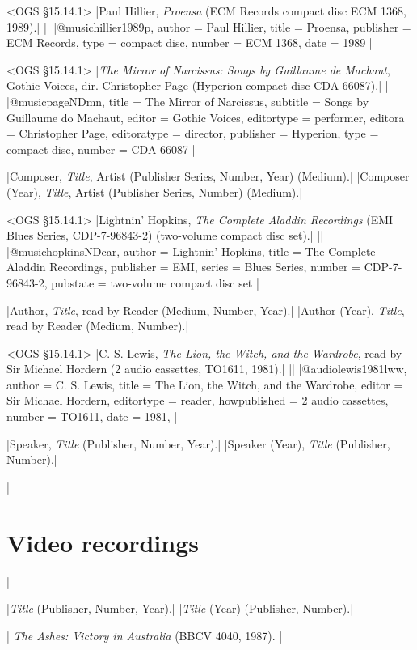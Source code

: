\documentclass[extrafontsizes,11pt,a4paper,oneside]{memoir}
\newcommand*{\lit}[1]{\textsf{#1}}
\begin{document}
\bibexample<OGS \S15.14.1>
|Paul Hillier, \emph{Proensa} (ECM Records compact disc ECM 1368, 1989).|%
||%
|@music{hillier1989p,
  author = {Paul Hillier},
  title = {Proensa},
  publisher = {ECM Records},
  type = {compact disc},
  number = {ECM 1368},
  date = {1989}
}|

\bibexample<OGS \S15.14.1>
|\emph{The Mirror of Narcissus: Songs by Guillaume de Machaut}, Gothic Voices, dir. Christopher Page (Hyperion compact disc CDA 66087).|%
||%
|@music{pageNDmn,
  title = {The Mirror of Narcissus},
  subtitle = {Songs by Guillaume do Machaut},
  editor = {Gothic Voices},
  editortype = {performer},
  editora = {Christopher Page},
  editoratype = {director},
  publisher = {Hyperion},
  type = {compact disc},
  number = {CDA 66087}
}|

\specs
|Composer, \emph{Title}, Artist (Publisher Series, Number, Year) (Medium).|%
|Composer (Year), \emph{Title}, Artist (Publisher Series, Number) (Medium).|

\bibexample<OGS \S15.14.1>
|Lightnin' Hopkins, \emph{The Complete Aladdin Recordings} (EMI Blues Series, CDP-7-96843-2) (two-volume compact disc set).|%
||%
|@music{hopkinsNDcar,
  author = {Lightnin’ Hopkins},
  title = {The Complete Aladdin Recordings},
  publisher = {EMI},
  series = {Blues Series},
  number = {CDP-7-96843-2},
  pubstate = {two-volume compact disc set}
}|

\specs
|Author, \emph{Title}, \lit{read by} Reader (Medium, Number, Year).|%
|Author (Year), \emph{Title}, \lit{read by} Reader (Medium, Number).|

\bibexample<OGS \S15.14.1>
|C. S. Lewis, \emph{The Lion, the Witch, and the Wardrobe}, read by Sir Michael Hordern (2 audio cassettes, TO1611, 1981).|%
||%
|@audio{lewis1981lww,
  author = {C. S. Lewis},
  title = {The Lion, the Witch, and the Wardrobe},
  editor = {Sir Michael Hordern},
  editortype = {reader},
  howpublished = {2 audio cassettes},
  number = {TO1611},
  date = {1981},
}|

\specs
|Speaker, \emph{Title} (Publisher, Number, Year).|%
|Speaker (Year), \emph{Title} (Publisher, Number).|

\todoc|
\section{Video recordings}
|

\specs
|\emph{Title} (Publisher, Number, Year).|%
|\emph{Title} (Year) (Publisher, Number).|

\todoc|
\emph{The Ashes: Victory in Australia} (BBCV 4040, 1987).
|
\end{document}
